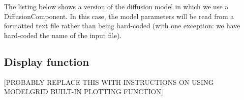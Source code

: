 \documentclass[12pt]{article}
\begin{document}
The listing below shows a version of the diffusion model in which we use a DiffusionComponent. In this case, the model parameters will be read from a formatted text file rather than being hard-coded (with one exception: we have hard-coded the name of the input file).

 

\subsection{Display function}

[PROBABLY REPLACE THIS WITH INSTRUCTIONS ON USING MODELGRID BUILT-IN PLOTTING FUNCTION]


\newpage


\end{document}
